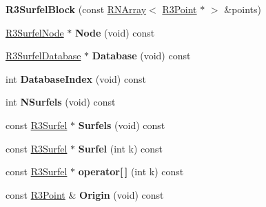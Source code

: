 \begin{DoxyCompactItemize}
\item 
{\bfseries R3\+Surfel\+Block} (const \hyperlink{class_r_n_array}{R\+N\+Array}$<$ \hyperlink{class_r3_point}{R3\+Point} $\ast$ $>$ \&points)\hypertarget{class_r3_surfel_block_af9a754d7c96230d74c685d5982a47f54}{}\label{class_r3_surfel_block_af9a754d7c96230d74c685d5982a47f54}

\item 
\hyperlink{class_r3_surfel_node}{R3\+Surfel\+Node} $\ast$ {\bfseries Node} (void) const \hypertarget{class_r3_surfel_block_aaf1c157e1b8f73799f976993bb8d6f0a}{}\label{class_r3_surfel_block_aaf1c157e1b8f73799f976993bb8d6f0a}

\item 
\hyperlink{class_r3_surfel_database}{R3\+Surfel\+Database} $\ast$ {\bfseries Database} (void) const \hypertarget{class_r3_surfel_block_a4d5a94cd5c42eedb972662a4637b8356}{}\label{class_r3_surfel_block_a4d5a94cd5c42eedb972662a4637b8356}

\item 
int {\bfseries Database\+Index} (void) const \hypertarget{class_r3_surfel_block_ae9bade9e96d0c4c193d3e0c94d319845}{}\label{class_r3_surfel_block_ae9bade9e96d0c4c193d3e0c94d319845}

\item 
int {\bfseries N\+Surfels} (void) const \hypertarget{class_r3_surfel_block_afdd9c9777775c10f01a1c7114f11c568}{}\label{class_r3_surfel_block_afdd9c9777775c10f01a1c7114f11c568}

\item 
const \hyperlink{class_r3_surfel}{R3\+Surfel} $\ast$ {\bfseries Surfels} (void) const \hypertarget{class_r3_surfel_block_a32113176fe15803d4bc2734fa15740d4}{}\label{class_r3_surfel_block_a32113176fe15803d4bc2734fa15740d4}

\item 
const \hyperlink{class_r3_surfel}{R3\+Surfel} $\ast$ {\bfseries Surfel} (int k) const \hypertarget{class_r3_surfel_block_a5a4e826b449d28554a8fc5b496bbe88e}{}\label{class_r3_surfel_block_a5a4e826b449d28554a8fc5b496bbe88e}

\item 
const \hyperlink{class_r3_surfel}{R3\+Surfel} $\ast$ {\bfseries operator\mbox{[}$\,$\mbox{]}} (int k) const \hypertarget{class_r3_surfel_block_a25be043d2ef1d900f273cee652394921}{}\label{class_r3_surfel_block_a25be043d2ef1d900f273cee652394921}

\item 
const \hyperlink{class_r3_point}{R3\+Point} \& {\bfseries Origin} (void) const \hypertarget{class_r3_surfel_block_a199efccaccae1bdd4af1e182fb07fbbe}{}\label{class_r3_surfel_block_a199efccaccae1bdd4af1e182fb07fbbe}


\end{DoxyCompactItemize}
